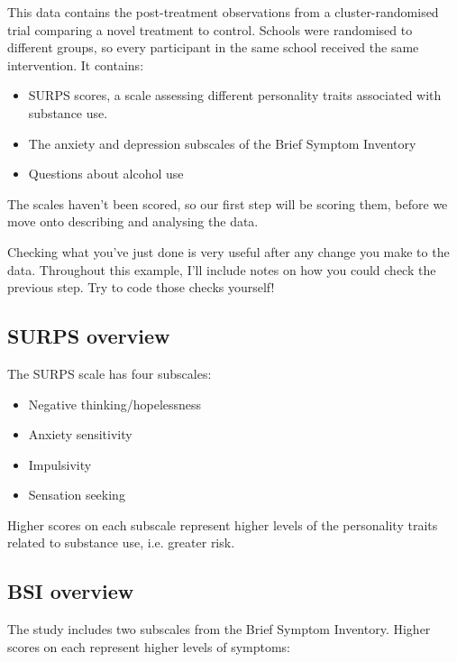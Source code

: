 \documentclass[
]{book}
\providecommand{\tightlist}{%
  \setlength{\itemsep}{0pt}\setlength{\parskip}{0pt}}
\begin{document}
This data contains the post-treatment observations from a
cluster-randomised trial comparing a novel treatment to control.
Schools were randomised to different groups, so every
participant in the same school received the same
intervention. It contains:

\begin{itemize}
\tightlist
\item
  SURPS scores, a scale assessing different personality traits
  associated with substance use.
\item
  The anxiety and depression subscales of the Brief Symptom Inventory
\item
  Questions about alcohol use
\end{itemize}

The scales haven't been scored, so our first step will be scoring
them, before we move onto describing and analysing the data.

\begin{note}
Checking what you've just done is very useful after any change you make
to the data. Throughout this example, I'll include notes on how you
could check the previous step. Try to code those checks yourself!
\end{note}

\hypertarget{surps-overview}{%
\subsection{SURPS overview}\label{surps-overview}}

The SURPS scale has four subscales:

\begin{itemize}
\tightlist
\item
  Negative thinking/hopelessness
\item
  Anxiety sensitivity
\item
  Impulsivity
\item
  Sensation seeking
\end{itemize}

Higher scores on each subscale represent higher levels
of the personality traits related to substance use, i.e.
greater risk.

\hypertarget{bsi-overview}{%
\subsection{BSI overview}\label{bsi-overview}}

The study includes two subscales from the Brief Symptom Inventory.
Higher scores on each represent higher levels of symptoms:
\end{document}
